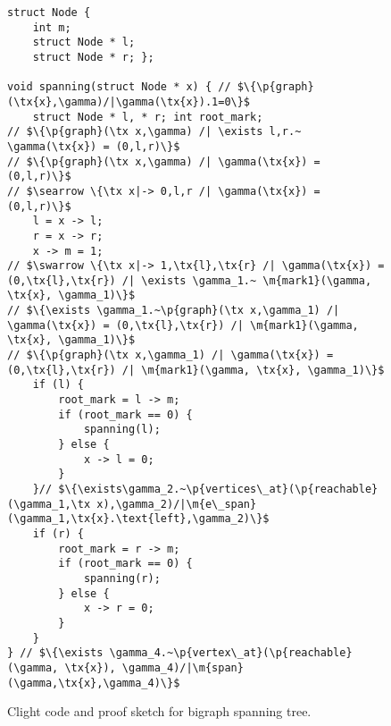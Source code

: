 \begin{figure}
  \begin{lstlisting}
struct Node {
    int m;
    struct Node * l;
    struct Node * r; };

void spanning(struct Node * x) { // $\{\p{graph}(\tx{x},\gamma)/|\gamma(\tx{x}).1=0\}$
    struct Node * l, * r; int root_mark;
// $\{\p{graph}(\tx x,\gamma) /| \exists l,r.~ \gamma(\tx{x}) = (0,l,r)\}$
// $\{\p{graph}(\tx x,\gamma) /| \gamma(\tx{x}) = (0,l,r)\}$
// $\searrow \{\tx x|-> 0,l,r /| \gamma(\tx{x}) = (0,l,r)\}$
    l = x -> l;
    r = x -> r;
    x -> m = 1;
// $\swarrow \{\tx x|-> 1,\tx{l},\tx{r} /| \gamma(\tx{x}) = (0,\tx{l},\tx{r}) /| \exists \gamma_1.~ \m{mark1}(\gamma, \tx{x}, \gamma_1)\}$
// $\{\exists \gamma_1.~\p{graph}(\tx x,\gamma_1) /| \gamma(\tx{x}) = (0,\tx{l},\tx{r}) /| \m{mark1}(\gamma, \tx{x}, \gamma_1)\}$
// $\{\p{graph}(\tx x,\gamma_1) /| \gamma(\tx{x}) = (0,\tx{l},\tx{r}) /| \m{mark1}(\gamma, \tx{x}, \gamma_1)\}$
    if (l) {
        root_mark = l -> m;
        if (root_mark == 0) {
            spanning(l);
        } else {
            x -> l = 0;
        }
    }// $\{\exists\gamma_2.~\p{vertices\_at}(\p{reachable}(\gamma_1,\tx x),\gamma_2)/|\m{e\_span}(\gamma_1,\tx{x}.\text{left},\gamma_2)\}$
    if (r) {
        root_mark = r -> m;
        if (root_mark == 0) {
            spanning(r);
        } else {
            x -> r = 0;
        }
    }
} // $\{\exists \gamma_4.~\p{vertex\_at}(\p{reachable}(\gamma, \tx{x}), \gamma_4)/|\m{span}(\gamma,\tx{x},\gamma_4)\}$
\end{lstlisting}

\caption{Clight code and proof sketch for bigraph spanning tree.}
  
\end{figure}
